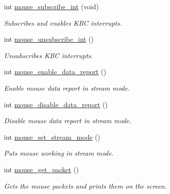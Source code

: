 \begin{DoxyCompactItemize}
int \hyperlink{group__Mouse_ga51e6ee02a5c0a7e618abde7250cd0841}{mouse\+\_\+subscribe\+\_\+int} (void)
\begin{DoxyCompactList}\small\item\em Subscribes and enables K\+BC interrupts. \end{DoxyCompactList}\item 
int \hyperlink{group__Mouse_ga685ad2706aca36d9869a30a19b9f446a}{mouse\+\_\+unsubscribe\+\_\+int} ()
\begin{DoxyCompactList}\small\item\em Unsubscribes K\+BC interrupts. \end{DoxyCompactList}\item 
int \hyperlink{group__Mouse_ga108813d01ba189cc8bb0dca728c932a8}{mouse\+\_\+enable\+\_\+data\+\_\+report} ()
\begin{DoxyCompactList}\small\item\em Enable mouse data report in stream mode. \end{DoxyCompactList}\item 
int \hyperlink{group__Mouse_gac13ad81d843b4d50815de4b20a28db53}{mouse\+\_\+disable\+\_\+data\+\_\+report} ()
\begin{DoxyCompactList}\small\item\em Disable mouse data report in stream mode. \end{DoxyCompactList}\item 
int \hyperlink{group__Mouse_ga16a521d1919cbd8f434d8b5d535a639b}{mouse\+\_\+set\+\_\+stream\+\_\+mode} ()
\begin{DoxyCompactList}\small\item\em Puts mouse working in stream mode. \end{DoxyCompactList}\item 
int \hyperlink{group__Mouse_ga1e54e352956b51fbf324d36d24befcbb}{mouse\+\_\+get\+\_\+packet} ()
\begin{DoxyCompactList}\small\item\em Gets the mouse packets and prints them on the screen. \end{DoxyCompactList}\end{DoxyCompactItemize}
